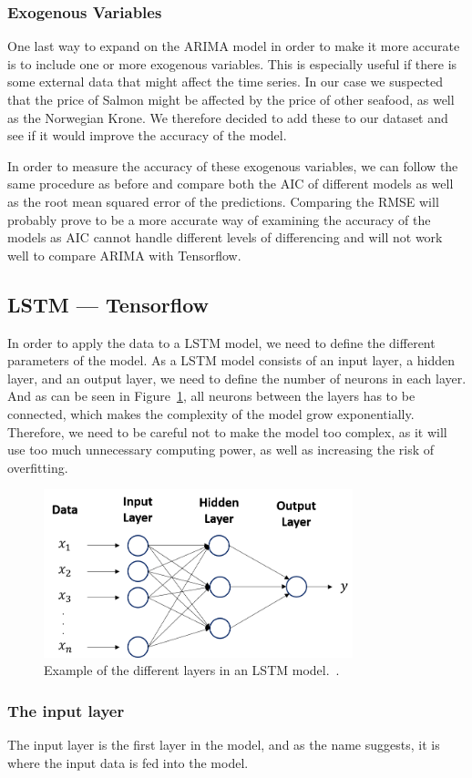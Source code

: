 \subsubsection{Exogenous Variables}
One last way to expand on the ARIMA model in order to make it more accurate is to include one or more exogenous variables. This is especially useful if there is some external data that might affect the time series. In our case we suspected that the price of Salmon might be affected by the price of other seafood, as well as the Norwegian Krone. We therefore decided to add these to our dataset and see if it would improve the accuracy of the model.

In order to measure the accuracy of these exogenous variables, we can follow the same procedure as before and compare both the AIC of different models as well as the root mean squared error of the predictions. Comparing the RMSE will probably prove to be a more accurate way of examining the accuracy of the models as AIC cannot handle different levels of differencing and will not work well to compare ARIMA with Tensorflow.~\parencite{brownlee_2017}
\subsection{LSTM --- Tensorflow}\label{Tensorflow_Methodology}
In order to apply the data to a LSTM model, we need to define the different parameters of the model. As a LSTM model consists of an input layer, a hidden layer, and an output layer, we need to define the number of neurons in each layer. And as can be seen in Figure~\ref{fig:Layers}, all neurons between the layers has to be connected, which makes the complexity of the model grow exponentially. Therefore, we need to be careful not to make the model too complex, as it will use too much unnecessary computing power, as well as increasing the risk of overfitting.

\begin{figure}[H]
    \centering
    \includegraphics[width=0.8\textwidth]{data/Figures/Neural networks/Layers_lstm.png}
    \caption[Example of the different layers in an LSTM model.]{Example of the different layers in an LSTM model.~\cite{towardsai_2020_1}.}\label{fig:Layers}
\end{figure}

\subsubsection{The input layer}
The input layer is the first layer in the model, and as the name suggests, it is where the input data is fed into the model. 